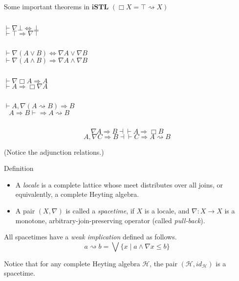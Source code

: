 \documentclass{beamer}
\begin{document}
\begin{frame}[t]{\subSTL}
	Some important theorems in $\mathbf{iSTL}$ \quad  $(\Box X = \top \rightsquigarrow X)$
	\begin{block}{}
		\begin{columns}
			\[ \vdash \nabla \bot \Leftrightarrow \bot \]
			\[ \vdash \top \Rightarrow \nabla \top \]
		\end{columns}
		\vspace{1ex}

		\begin{columns}
			\column{0.5\textwidth}
			\[ \vdash \nabla (A \vee B) \Leftrightarrow \nabla A \vee \nabla B \]
			\column{0.5\textwidth}
			\[ \vdash \nabla (A \wedge B) \Rightarrow \nabla A \wedge \nabla B \]
		\end{columns}
		\vspace{1ex}

		\begin{columns}
			\[ \vdash \nabla \Box A \Rightarrow A \]
			\[ \vdash A \Rightarrow \Box \nabla A \]
		\end{columns}
		\vspace{1ex}

		\begin{columns}
			\column{0.5\textwidth}
			\[ \vdash A, \nabla (A \rightsquigarrow B) \Rightarrow B \]
			\column{0.5\textwidth}
			\[ A \Rightarrow B \vdash \Rightarrow A \rightsquigarrow B \]
		\end{columns}
		\[ \nabla A \Rightarrow B \dashv\vdash A \Rightarrow \Box B \]
		\[ A, \nabla C \Rightarrow B \dashv\vdash C \Rightarrow A \rightsquigarrow B \]
	\end{block}

	(Notice the adjunction relations.) 
\end{frame}

\begin{frame}{\subSemantics}
	\begin{block}{Definition}
		\begin{itemize}
			\item A \emph{locale} is a complete lattice whose meet distributes over all joins, or equivalently, a complete Heyting algebra.
			\item A pair $(X, \nabla)$ is called a \emph{spacetime}, if $X$ is a locale, and $\nabla : X \rightarrow X$ is a monotone, arbitrary-join-preserving operator (called \emph{pull-back}).
			\cite{amir}
		\end{itemize}
	\end{block}

	All spacetimes have a \emph{weak implication} defined as follows. \[a \rightsquigarrow b = \bigvee \{ x \mid a \wedge \nabla x \leq b \} \]

	Notice that for any complete Heyting algebra $\mathcal{H}$, the pair $(\mathcal{H}, id_\mathcal{H})$ is a spacetime.
\end{frame}
\end{document}
